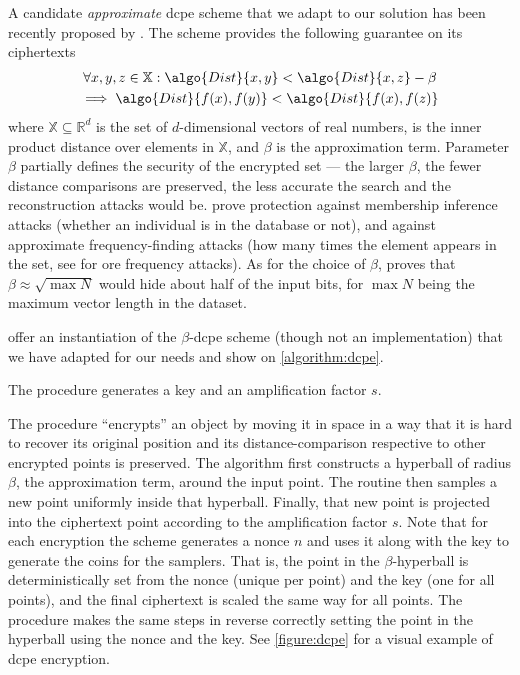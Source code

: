 			A candidate \emph{approximate} \acrshort{dcpe} scheme that we adapt to our solution has been recently proposed by \textcite{dcpe}.
			The scheme provides the following guarantee on its ciphertexts
			\begin{multline*}
				\forall x, y, z \in \mathbb{X} : \algo{Dist}{x, y} < \algo{Dist}{x, z} - \beta \\
				\implies \algo{Dist}{f(x), f(y)} < \algo{Dist}{f(x), f(z)}
			\end{multline*}
			where $\mathbb{X} \subseteq \mathbb{R}^d$ is the set of $d$-dimensional vectors of real numbers,  is the inner product distance over elements in $\mathbb{X}$, and $\beta$ is the approximation term.
			Parameter $\beta$ partially defines the security of the encrypted set --- the larger $\beta$, the fewer distance comparisons are preserved, the less accurate the search and the reconstruction attacks would be.
			\textcite{dcpe} prove protection against membership inference attacks \cite{memebership-inference-attacks-knn} (whether an individual is in the database or not), and against approximate frequency-finding attacks (how many times the element appears in the set, see \cite{leakage-abuse-grubs-2017} for \acrshort{ore} frequency attacks).
			As for the choice of $\beta$, \textcite{dcpe} proves that $\beta \approx \sqrt{\max N}$ would hide about half of the input bits, for $\max N$ being the maximum vector length in the dataset.

			

			\textcite{dcpe} offer an instantiation of the $\beta$-\acrshort{dcpe} scheme (though not an implementation) that we have adapted for our needs and show on \cref{algorithm:dcpe}.

			The  procedure generates a key \key{} and an amplification factor $s$.

			The  procedure ``encrypts'' an object by moving it in space in a way that it is hard to recover its original position and its distance-comparison respective to other encrypted points is preserved.
			The algorithm first constructs a hyperball of radius $\beta$, the approximation term, around the input point.
			The routine then samples a new point uniformly inside that hyperball.
			Finally, that new point is projected into the ciphertext point according to the amplification factor $s$.
			Note that for each encryption the scheme generates a nonce $n$ and uses it along with the key \key{} to generate the coins for the samplers.
			That is, the point in the $\beta$-hyperball is deterministically set from the nonce (unique per point) and the key (one for all points), and the final ciphertext is scaled the same way for all points.
			The  procedure makes the same steps in reverse correctly setting the point in the hyperball using the nonce and the key.
			See \cref{figure:dcpe} for a visual example of \acrshort{dcpe} encryption.

